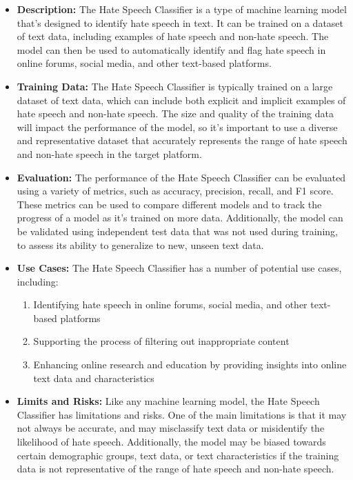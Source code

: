 \begin{itemize}
    \item \textbf{Description:} The Hate Speech Classifier is a type of machine learning model that's designed to identify hate speech in text. It can be trained on a dataset of text data, including examples of hate speech and non-hate speech. The model can then be used to automatically identify and flag hate speech in online forums, social media, and other text-based platforms.
    \item \textbf{Training Data:} The Hate Speech Classifier is typically trained on a large dataset of text data, which can include both explicit and implicit examples of hate speech and non-hate speech. The size and quality of the training data will impact the performance of the model, so it's important to use a diverse and representative dataset that accurately represents the range of hate speech and non-hate speech in the target platform.
    \item \textbf{Evaluation:} The performance of the Hate Speech Classifier can be evaluated using a variety of metrics, such as accuracy, precision, recall, and F1 score. These metrics can be used to compare different models and to track the progress of a model as it's trained on more data. Additionally, the model can be validated using independent test data that was not used during training, to assess its ability to generalize to new, unseen text data.
    \item \textbf{Use Cases:} The Hate Speech Classifier has a number of potential use cases, including:
        \begin{enumerate}  
            \item Identifying hate speech in online forums, social media, and other text-based platforms
            \item Supporting the process of filtering out inappropriate content
            \item Enhancing online research and education by providing insights into online text data and characteristics
        \end{enumerate}
    \item \textbf{Limits and Risks:} Like any machine learning model, the Hate Speech Classifier has limitations and risks. One of the main limitations is that it may not always be accurate, and may misclassify text data or misidentify the likelihood of hate speech. Additionally, the model may be biased towards certain demographic groups, text data, or text characteristics if the training data is not representative of the range of hate speech and non-hate speech.

\end{itemize}

